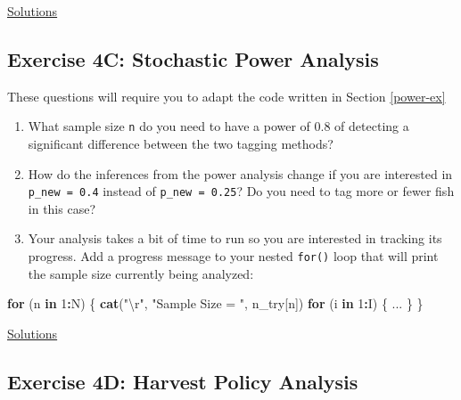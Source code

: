 \documentclass[]{book}
\newenvironment{Shaded}{\begin{snugshade}}{\end{snugshade}}
\newcommand{\KeywordTok}[1]{\textcolor[rgb]{0.13,0.29,0.53}{\textbf{#1}}}
\newcommand{\DecValTok}[1]{\textcolor[rgb]{0.00,0.00,0.81}{#1}}
\newcommand{\CharTok}[1]{\textcolor[rgb]{0.31,0.60,0.02}{#1}}
\newcommand{\StringTok}[1]{\textcolor[rgb]{0.31,0.60,0.02}{#1}}
\newcommand{\ControlFlowTok}[1]{\textcolor[rgb]{0.13,0.29,0.53}{\textbf{#1}}}
\newcommand{\OperatorTok}[1]{\textcolor[rgb]{0.81,0.36,0.00}{\textbf{#1}}}
\newcommand{\NormalTok}[1]{#1}
\providecommand{\tightlist}{%
  \setlength{\itemsep}{0pt}\setlength{\parskip}{0pt}}
\theoremstyle{definition}
\theoremstyle{definition}
\theoremstyle{definition}
\theoremstyle{remark}
\begin{document}
\protect\hyperlink{ex4b-answers}{Solutions}

\subsection*{Exercise 4C: Stochastic Power
Analysis}\label{exercise-4c-stochastic-power-analysis}

These questions will require you to adapt the code written in Section
\ref{power-ex}

\begin{enumerate}
\def\labelenumi{\arabic{enumi}.}
\tightlist
\item
  What sample size \texttt{n} do you need to have a power of 0.8 of
  detecting a significant difference between the two tagging methods?
\item
  How do the inferences from the power analysis change if you are
  interested in \texttt{p\_new\ =\ 0.4} instead of
  \texttt{p\_new\ =\ 0.25}? Do you need to tag more or fewer fish in
  this case?
\item
  Your analysis takes a bit of time to run so you are interested in
  tracking its progress. Add a progress message to your nested
  \texttt{for()} loop that will print the sample size currently being
  analyzed:
\end{enumerate}

\begin{Shaded}
\begin{Highlighting}[]
\ControlFlowTok{for}\NormalTok{ (n }\ControlFlowTok{in} \DecValTok{1}\OperatorTok{:}\NormalTok{N) \{}
  \KeywordTok{cat}\NormalTok{(}\StringTok{"}\CharTok{\textbackslash{}r}\StringTok{"}\NormalTok{, }\StringTok{"Sample Size = "}\NormalTok{, n_try[n])}
  \ControlFlowTok{for}\NormalTok{ (i }\ControlFlowTok{in} \DecValTok{1}\OperatorTok{:}\NormalTok{I) \{}
\NormalTok{    ...}
\NormalTok{  \}}
\NormalTok{\}}
\end{Highlighting}
\end{Shaded}

\protect\hyperlink{ex4c-answers}{Solutions}

\subsection*{Exercise 4D: Harvest Policy
Analysis}\label{exercise-4d-harvest-policy-analysis}
\end{document}
